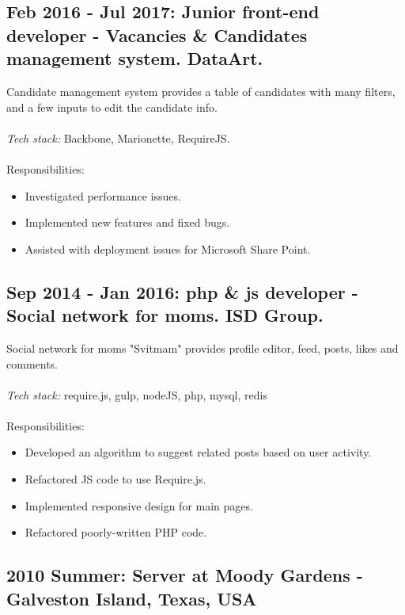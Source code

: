 \documentclass[a4paper, 14pt]{article}
\begin{document}
  \subsection{Feb 2016 - Jul 2017: Junior front-end developer - Vacancies \& Candidates management system. DataArt.}
  Candidate management system provides a table of candidates with many filters, and a few inputs to edit the candidate info. \\
  \\
    \textit{Tech stack:} Backbone, Marionette, RequireJS. \\
  \\
  Responsibilities:
    \begin{itemize}
      \item Investigated performance issues. \\
      \item Implemented new features and fixed bugs. \\
      \item Assisted with deployment issues for Microsoft Share Point.
    \end{itemize}

  \subsection{Sep 2014 - Jan 2016: php \& js developer - Social network for moms. ISD Group.}
    Social network for moms "Svitmam" provides profile editor, feed, posts, likes and comments. \\
  \\
  \textit{Tech stack:} require.js, gulp, nodeJS, php, mysql, redis \\
  \\
  Responsibilities:
  \begin{itemize}
    \item Developed an algorithm to suggest related posts based on user activity. \\
    \item Refactored JS code to use Require.js. \\
    \item Implemented responsive design for main pages. \\
    \item Refactored poorly-written PHP code.
  \end{itemize}

  \subsection{2010 Summer: Server at Moody Gardens - Galveston Island, Texas, USA}
\end{document}
